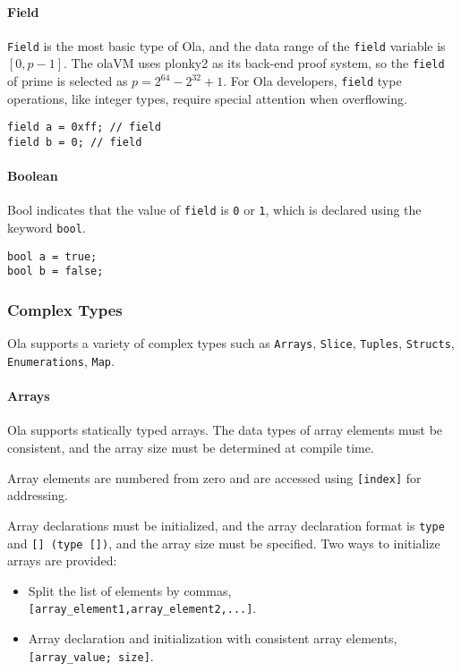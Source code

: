 \paragraph{Field}
\texttt{Field} is the most basic type of Ola, and the data range of the \texttt{field} variable is $[0, p-1]$.
The olaVM uses plonky2 as its back-end proof system, so the \texttt{field} of prime is selected as $p=2^{64}-2^{32}+1$. 
For Ola developers, \texttt{field} type operations, like integer types, require special attention when overflowing.

\begin{verbatim}
field a = 0xff; // field
field b = 0; // field
\end{verbatim}

\paragraph{Boolean}

Bool indicates that the value of \texttt{field} is \texttt{0} or \texttt{1}, which is declared using the keyword \texttt{bool}.
\begin{verbatim}
bool a = true;
bool b = false;
\end{verbatim}

\subsubsection{Complex Types}

Ola supports a variety of complex types such as \texttt{Arrays}, \texttt{Slice}, \texttt{Tuples}, \texttt{Structs}, \texttt{Enumerations}, \texttt{Map}.

\paragraph{Arrays}

Ola supports statically typed arrays. The data types of array elements must be consistent, and the array size must be determined at compile time. 

Array elements are numbered from zero and are accessed using \texttt{[index]} for addressing.

Array declarations must be initialized, and the array declaration format is \texttt{type} and \texttt{[] (\texttt{type []})}, and the array size must be specified.
Two ways to initialize arrays are provided:
\begin{itemize}
    \item Split the list of elements by commas, \texttt{[array\_element1,array\_element2,...]}.
    \item Array declaration and initialization with consistent array elements, \texttt{[array\_value; size]}.
\end{itemize}

